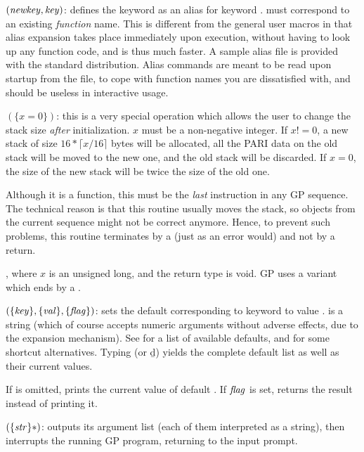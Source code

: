 $(\hbox{\it newkey\/},\hbox{\it key\/})$: defines the keyword
 as an alias for keyword .  must correspond
to an existing \emph{function} name. This is different from the general user
macros in that alias expansion takes place immediately upon execution,
without having to look up any function code, and is thus much faster. A
sample alias file  is provided with the standard
distribution. Alias commands are meant to be read upon startup from the
 file, to cope with function names you are dissatisfied with, and
should be useless in interactive usage.

$(\{x=0\})$: this is a very special operation which
allows the user to change the stack size \emph{after} initialization. $x$
must be a non-negative integer. If $x!=0$, a new stack of size $16*\lceil
x/16\rceil$ bytes will be allocated, all the PARI data on the old stack will
be moved to the new one, and the old stack will be discarded. If $x=0$, the
size of the new stack will be twice the size of the old one.

Although it is a function, this must be the \emph{last} instruction in any GP
sequence. The technical reason is that this routine usually moves the stack,
so objects from the current sequence might not be correct anymore. Hence, to
prevent such problems, this routine terminates by a  (just as an
error would) and not by a return.

, where $x$ is an unsigned long, and the return type
is void. GP uses a variant which ends by a .

$(\{\hbox{\it key\/}\},\{\hbox{\it val\/}\},\{\hbox{\it f\kern0pt lag\/}\})$: sets the default
corresponding to keyword  to value .  is a string
(which of course accepts numeric arguments without adverse effects, due to the
expansion mechanism). See  for a list of available
defaults, and  for some shortcut alternatives. Typing
 (or \b{d}) yields the complete default list as well as
their current values.\label{se:default}

If  is omitted, prints the current value of default .
If $\hbox{\it f\kern0pt lag\/}$ is set, returns the result instead of printing it.

$(\{\hbox{\it str\/}\}*)$: outputs its argument list (each of
them interpreted as a string), then interrupts the running GP program,
returning to the input prompt.

